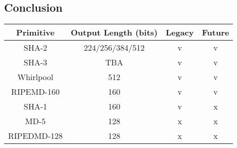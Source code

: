 \subsection{Conclusion}
\begin{center}
    \begin{tabular}{|c|c|c|c|}
        \hline
        Primitive   & Output Length (bits)   & Legacy & Future \\
        \hline
        SHA-2       & 224/256/384/512 & \textcolor{green!50!black}{v}
        & \textcolor{green!50!black}{v} \\
        SHA-3       & TBA             & \textcolor{green!50!black}{v}
        & \textcolor{green!50!black}{v} \\
        Whirlpool   & 512             & \textcolor{green!50!black}{v}
        & \textcolor{green!50!black}{v} \\
        \hline
        RIPEMD-160  & 160             & \textcolor{green!50!black}{v}&
        \textcolor{green!50!black}{v}\\
        SHA-1       & 160             & \textcolor{green!50!black}{v}&
        \textcolor{red!50!black}{x} \\
        \hline
        MD-5        & 128             & \textcolor{red!50!black}{x}&
        \textcolor{red!50!black}{x}\\
        RIPEDMD-128 & 128             & \textcolor{red!50!black}{x}&
        \textcolor{red!50!black}{x}\\
        \hline
    \end{tabular}
\end{center}


